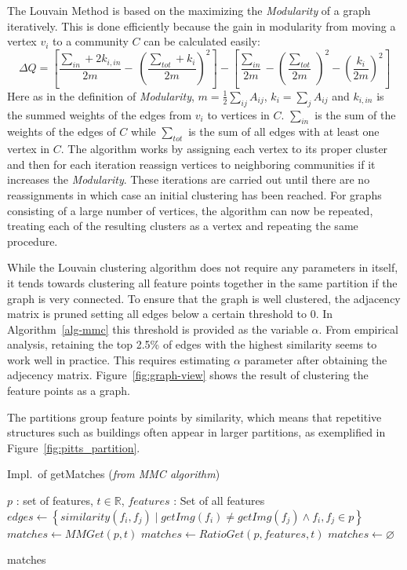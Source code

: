 The Louvain Method is based on the maximizing the \emph{Modularity} of a 
graph iteratively. This is done efficiently because the gain in 
modularity from moving a vertex $v_i$ to a community $C$ can be 
calculated easily:
\begin{equation*}
	\Delta Q = \left[ \frac{\sum_{in} + 2 k_{i,in}}{2m} - \
    \left(\frac{\sum_{tot} + k_i}{2m} \right)^2 \right]
	- \left[\frac{\sum_{in}}{2m} - \left(\frac{\sum_{tot}}{2m} \
	\right)^2 - \left( \frac{k_i}{2m} \right)^2 \right]
\end{equation*}
Here as in the definition of \emph{Modularity}, $m=\frac{1}{2} \sum_{ij} 
A_{ij}$, $k_i = \sum_j A_{ij}$ and $k_{i,in}$ is the summed weights of 
the edges from $v_i$ to vertices in $C$.  $\sum_{in}$ is the sum of the 
weights of the edges of $C$ while $\sum_{tot}$ is the sum of all edges 
with at least one vertex in $C$.  The algorithm works by assigning each 
vertex to its proper cluster and then for each iteration reassign 
vertices to neighboring communities if it increases the 
\emph{Modularity}.  These iterations are carried out until there are no 
reassignments in which case an initial clustering has been reached.  For 
graphs consisting of a large number of vertices, the algorithm can now 
be repeated, treating each of the resulting clusters as a vertex and 
repeating the same procedure.

While the Louvain clustering algorithm does not require any parameters 
in itself, it tends towards clustering all feature points together in 
the same partition if the graph is very connected.  To ensure that the 
graph is well clustered, the adjacency matrix is pruned setting all 
edges below a certain threshold to $0$. In Algorithm~\ref{alg-mmc} this 
threshold is provided as the variable $\alpha$.  From empirical 
analysis, retaining the top 2.5\% of edges with the highest similarity 
seems to work well in practice. This requires estimating $\alpha$ 
parameter after obtaining the adjecency matrix.  
Figure~\ref{fig:graph-view} shows the result of clustering the feature 
points as a graph.

The partitions group feature points by similarity, which means that 
repetitive structures such as buildings often appear in larger 
partitions, as exemplified in Figure~\ref{fig:pitts_partition}.

\begin{algorithm}[htb]
\caption{Impl.\ of getMatches (\emph{from MMC algorithm})}
\label{alg-getmatches}
    \begin{algorithmic}
    \Require $p$ : set of features, $t\in \mathbb{R}$, $features$ : Set of 
    all features
    \State $edges \gets \left\{similarity(f_i, f_j) \mid getImg(f_i)
        \neq getImg(f_j) \wedge f_i, f_j \in p \right\}$
    \If{$\left\vert edges \right\vert > 1$}
        \State $matches \gets MMGet(p, t)$
        \State $matches \gets RatioGet(p, features, t)$
    \Else
        \State $matches \gets \varnothing$
    \EndIf

    \Return matches
    \end{algorithmic}
\end{algorithm}

